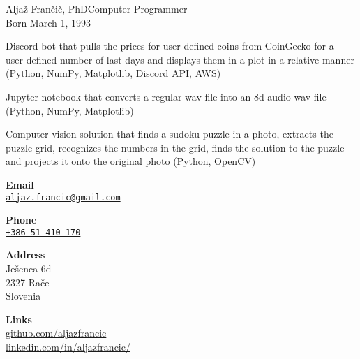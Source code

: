 \documentclass{article}
\begin{document}
\begin{cv}[avatar]{Aljaž Frančič, PhD}{Computer Programmer\\\small{Born March 1, 1993}}
\begin{cvevent}
    Discord bot that pulls the prices for user-defined coins from CoinGecko for a user-defined number of last days and displays them in a plot in a relative manner (Python, NumPy, Matplotlib, Discord API, AWS)
\end{cvevent}

\cvseparator[2]
\begin{cvevent}
    Jupyter notebook that converts a regular wav file into an 8d audio wav file (Python, NumPy, Matplotlib)

\end{cvevent}

\cvseparator[2]
\begin{cvevent}
   Computer vision solution that finds a sudoku puzzle in a photo, extracts the puzzle grid, recognizes the numbers in the grid, finds the solution to the puzzle and projects it onto the original photo (Python, OpenCV)
\end{cvevent}


\cvsidebar %



\begin{cvitem}[Envelope][4]
    \textbf{Email}\\
    \href{mailto:aljaz.francic@gmail.com}{\texttt{aljaz.francic@gmail.com}}
\end{cvitem}

\cvseparator[3]
\begin{cvitem}[Phone][4]
    \textbf{Phone}\\
    \href{tel:+442071234567}{\texttt{+386 51 410 170}}
\end{cvitem}

\cvseparator[3]
\begin{cvitem}[Home][4]
    \textbf{Address}\\
    Ješenca 6d\\ 2327 Rače \\ Slovenia
\end{cvitem}

\cvseparator[3]
\begin{cvitem}[Globe][4]
     \textbf{Links}\\
     \href{https://github.com/aljazfrancic}{github.com/aljazfrancic}\\
     \href{https://www.linkedin.com/in/aljazfrancic}{linkedin.com/in/aljazfrancic/}
\end{cvitem}



\end{cv}
\end{document}
